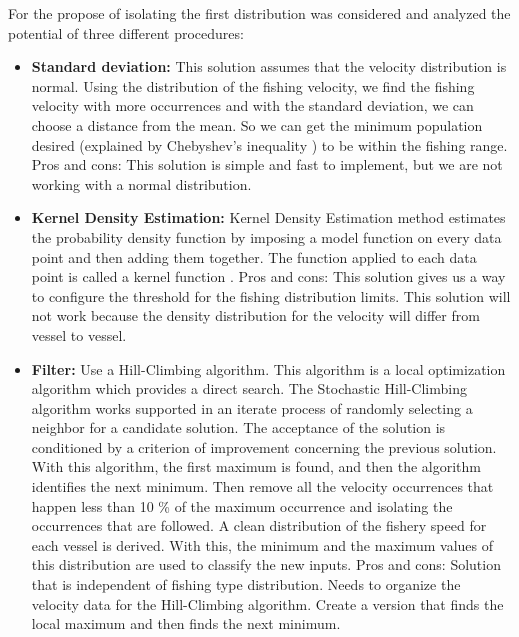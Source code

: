 For the propose of isolating the first distribution was considered and analyzed the potential of three different procedures:
\begin{itemize}
\item \textbf{Standard deviation:}
This solution assumes that the velocity distribution is normal. Using the distribution of the fishing velocity, we find the fishing velocity with more occurrences and with the standard deviation, we can choose a distance from the mean. So we can get the minimum population desired (explained by Chebyshev's inequality \cite{Chebyshevinequality}) to be within the fishing range. \\
Pros and cons: This solution is simple and fast to implement, but we are not working with a normal distribution.

\item \textbf{Kernel Density Estimation:}
Kernel Density Estimation method estimates the probability density function by imposing a model function on every data point and then adding them together. The function applied to each data point is called a kernel function \cite{KernelDensityEstimation}.
Pros and cons: This solution gives us a way to configure the threshold for the fishing distribution limits. This solution will not work because the density distribution for the velocity will differ from vessel to vessel. 

\item \textbf{Filter:}
Use a Hill-Climbing algorithm\cite{Kvasnicka1995HillCW}. This algorithm is a local optimization algorithm which provides a direct search. The Stochastic Hill-Climbing algorithm works supported in an iterate process of randomly selecting a neighbor for a candidate solution. The acceptance of the solution is conditioned by a criterion of improvement concerning the previous solution. With this algorithm, the first maximum is found, and then the algorithm identifies the next minimum.
Then remove all the velocity occurrences that happen less than 10 \% of the maximum occurrence and isolating the occurrences that are followed. A clean distribution of the fishery speed for each vessel is derived. With this, the minimum and the maximum values of this distribution are used to classify the new inputs.
Pros and cons: Solution that is independent of fishing type distribution. Needs to organize the velocity data for the Hill-Climbing algorithm. Create a version that finds the local maximum and then finds the next minimum.
\end{itemize}

